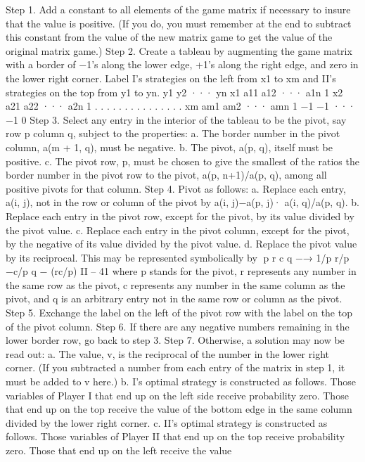 Step 1. Add a constant to all elements of the game matrix if necessary to insure that the
value is positive. (If you do, you must remember at the end to subtract this constant from
the value of the new matrix game to get the value of the original matrix game.)
Step 2. Create a tableau by augmenting the game matrix with a border of −1’s along
the lower edge, +1’s along the right edge, and zero in the lower right corner. Label I’s
strategies on the left from x1 to xm and II’s strategies on the top from y1 to yn.
y1 y2 ··· yn
x1 a11 a12 ··· a1n 1
x2 a21 a22 ··· a2n 1
.
.
. .
.
. .
.
. .
.
. .
.
.
xm am1 am2 ··· amn 1
−1 −1 ··· −1 0
Step 3. Select any entry in the interior of the tableau to be the pivot, say row p column q,
subject to the properties:
a. The border number in the pivot column, a(m + 1, q), must be negative.
b. The pivot, a(p, q), itself must be positive.
c. The pivot row, p, must be chosen to give the smallest of the ratios the border
number in the pivot row to the pivot, a(p, n+1)/a(p, q), among all positive pivots for that
column.
Step 4. Pivot as follows:
a. Replace each entry, a(i, j), not in the row or column of the pivot by a(i, j)−a(p, j)·
a(i, q)/a(p, q).
b. Replace each entry in the pivot row, except for the pivot, by its value divided by
the pivot value.
c. Replace each entry in the pivot column, except for the pivot, by the negative of its
value divided by the pivot value.
d. Replace the pivot value by its reciprocal.
This may be represented symbolically by
p r
c q −→ 1/p r/p
−c/p q − (rc/p)
II – 41
where p stands for the pivot, r represents any number in the same row as the pivot, c
represents any number in the same column as the pivot, and q is an arbitrary entry not in
the same row or column as the pivot.
Step 5. Exchange the label on the left of the pivot row with the label on the top of the
pivot column.
Step 6. If there are any negative numbers remaining in the lower border row, go back to
step 3.
Step 7. Otherwise, a solution may now be read out:
a. The value, v, is the reciprocal of the number in the lower right corner. (If you
subtracted a number from each entry of the matrix in step 1, it must be added to v here.)
b. I’s optimal strategy is constructed as follows. Those variables of Player I that end
up on the left side receive probability zero. Those that end up on the top receive the value
of the bottom edge in the same column divided by the lower right corner.
c. II’s optimal strategy is constructed as follows. Those variables of Player II that
end up on the top receive probability zero. Those that end up on the left receive the value
